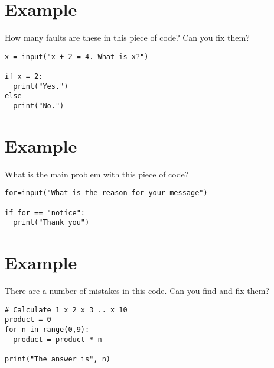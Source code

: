 \documentclass[12pt,oneside]{cttutorial}
\begin{document}
\section{Example}

How many faults are these in this piece of code? Can you fix them?

\begin{lstlisting}
x = input("x + 2 = 4. What is x?")

if x = 2:
  print("Yes.")
else
  print("No.")
\end{lstlisting}

\section{Example}

What is the main problem with this piece of code?

\begin{lstlisting}
for=input("What is the reason for your message")

if for == "notice":
  print("Thank you")
\end{lstlisting}

\section{Example}

There are a number of mistakes in this code. Can you find and fix them?

\begin{lstlisting}
# Calculate 1 x 2 x 3 .. x 10
product = 0
for n in range(0,9):
  product = product * n
  
print("The answer is", n)
\end{lstlisting}
\end{document}

